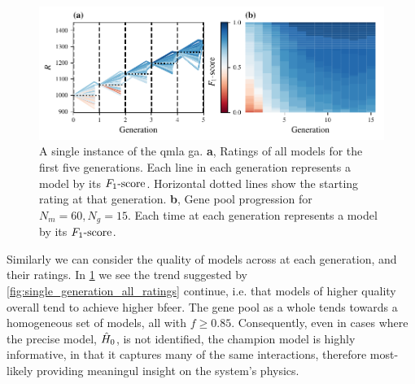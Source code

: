 \par 
\begin{figure}
    \begin{center}
        \includegraphics{theoretical_study/figures/gen_alg_instance_combined.pdf}
    \end{center}
    \caption[\Gls{instance} of \gls{qmla} \gls{ga}.]{
        A single \gls{instance} of the \gls{qmla} \gls{ga}.
        \textbf{a}, Ratings of all models for the first five generations. 
        Each line in each generation represents a model by its $ F_{1}\text{-score} $. 
        Horizontal dotted lines show the starting rating at that generation. 
        \textbf{b}, Gene pool progression for $N_m=60, N_g=15$. 
        Each time at each generation represents a model by its $ F_{1}\text{-score} $. 
    }
    \label{fig:ga_instance}
\end{figure}

Similarly we can consider the quality of models across at each generation,
    and their ratings. 
In \cref{fig:ga_instance} we see the trend suggested by \cref{fig:single_generation_all_ratings} continue,
    i.e. that models of higher quality overall tend to achieve higher \gls{bfeer}.
The gene pool as a whole tends towards a homogeneous set of models, all with $f \geq 0.85$. 
Consequently, even in cases where the precise model, $\hat{H}_0$, is not identified, the champion model
    is highly informative, in that it captures many of the same interactions, 
    therefore most-likely providing meaningul insight on the system's physics. 

